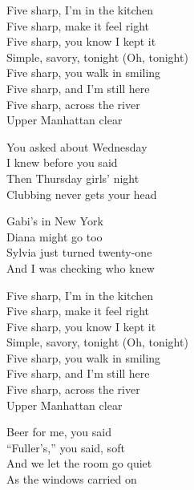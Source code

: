 \begin{lyrics}
Five sharp, I’m in the kitchen\\
Five sharp, make it feel right\\
Five sharp, you know I kept it\\
Simple, savory, tonight
(Oh, tonight)\\
Five sharp, you walk in smiling\\
Five sharp, and I’m still here\\
Five sharp, across the river\\
Upper Manhattan clear

You asked about Wednesday\\
I knew before you said\\
Then Thursday girls’ night\\
Clubbing never gets your head

Gabi’s in New York\\
Diana might go too\\
Sylvia just turned twenty-one\\
And I was checking who knew

Five sharp, I’m in the kitchen\\
Five sharp, make it feel right\\
Five sharp, you know I kept it\\
Simple, savory, tonight
(Oh, tonight)\\
Five sharp, you walk in smiling\\
Five sharp, and I’m still here\\
Five sharp, across the river\\
Upper Manhattan clear

Beer for me, you said\\
“Fuller’s,” you said, soft\\
And we let the room go quiet\\
As the windows carried on
\end{lyrics}

